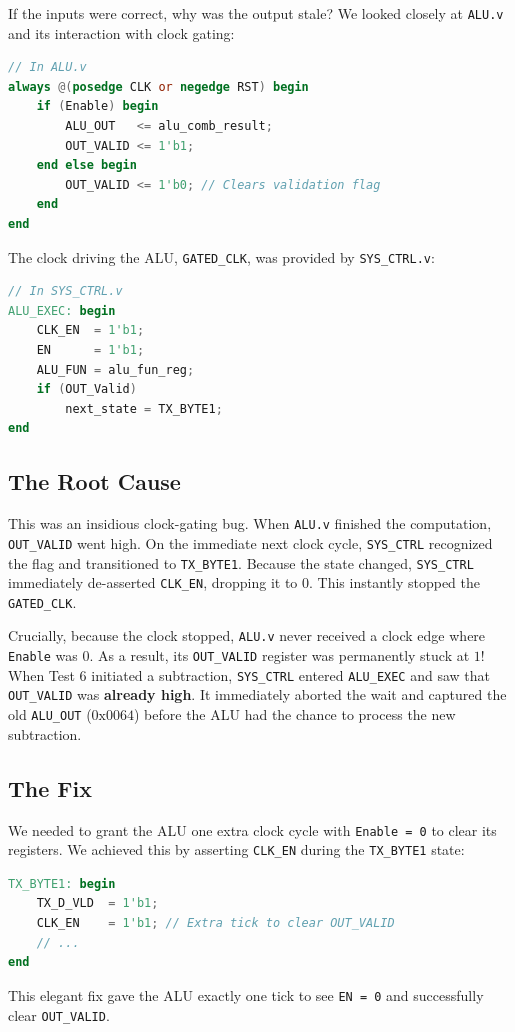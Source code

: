 \documentclass[11pt,a4paper]{article}
\begin{document}
If the inputs were correct, why was the output stale? We looked closely at \texttt{ALU.v} and its interaction with clock gating:
\begin{lstlisting}[language=Verilog]
// In ALU.v
always @(posedge CLK or negedge RST) begin
    if (Enable) begin
        ALU_OUT   <= alu_comb_result;
        OUT_VALID <= 1'b1;
    end else begin
        OUT_VALID <= 1'b0; // Clears validation flag
    end
end
\end{lstlisting}

The clock driving the ALU, \texttt{GATED\_CLK}, was provided by \texttt{SYS\_CTRL.v}:
\begin{lstlisting}[language=Verilog]
// In SYS_CTRL.v
ALU_EXEC: begin
    CLK_EN  = 1'b1;
    EN      = 1'b1;
    ALU_FUN = alu_fun_reg;
    if (OUT_Valid)
        next_state = TX_BYTE1;
end
\end{lstlisting}

\subsection{The Root Cause}
This was an insidious clock-gating bug. When \texttt{ALU.v} finished the computation, \texttt{OUT\_VALID} went high. On the immediate next clock cycle, \texttt{SYS\_CTRL} recognized the flag and transitioned to \texttt{TX\_BYTE1}.
Because the state changed, \texttt{SYS\_CTRL} immediately de-asserted \texttt{CLK\_EN}, dropping it to $0$. 
This instantly stopped the \texttt{GATED\_CLK}. 

Crucially, because the clock stopped, \texttt{ALU.v} never received a clock edge where \texttt{Enable} was $0$. As a result, its \texttt{OUT\_VALID} register was permanently stuck at $1$! 
When Test 6 initiated a subtraction, \texttt{SYS\_CTRL} entered \texttt{ALU\_EXEC} and saw that \texttt{OUT\_VALID} was \textbf{already high}. It immediately aborted the wait and captured the old \texttt{ALU\_OUT} ($0\text{x0064}$) before the ALU had the chance to process the new subtraction.

\subsection{The Fix}
We needed to grant the ALU one extra clock cycle with \texttt{Enable = 0} to clear its registers. We achieved this by asserting \texttt{CLK\_EN} during the \texttt{TX\_BYTE1} state:
\begin{lstlisting}[language=Verilog]
TX_BYTE1: begin
    TX_D_VLD  = 1'b1;
    CLK_EN    = 1'b1; // Extra tick to clear OUT_VALID
    // ...
end
\end{lstlisting}
This elegant fix gave the ALU exactly one tick to see \texttt{EN = 0} and successfully clear \texttt{OUT\_VALID}.
\end{document}
